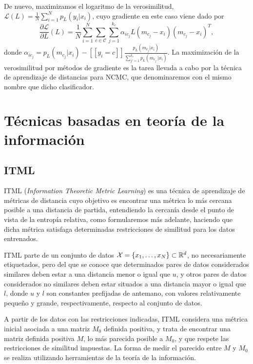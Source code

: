 De nuevo, maximizamos el logaritmo de la verosimilitud, $\mathcal{L}(L) = \frac{1}{N}\sum_{i=1}^N p_L(y_i|x_i)$, cuyo gradiente en este caso viene dado por
\begin{equation*}
    \frac{\partial \mathcal{L}}{\partial L}(L) = \frac{1}{N} \sum_{i=1}^N \sum_{c \in \mathcal{C}} \sum_{j=1}^{k_c} \alpha_{ic_j} L (m_{c_j}-x_i)(m_{c_j}-x_i)^T,
\end{equation*}
donde $\alpha_{ic_j} = p_L(m_{c_j}|x_i) - [\![ y_i = c ]\!] \frac{p_L(m_{c_j}|x_i)}{\sum_{j'=1}^{k_c} p_L(m_{c_{j'}}|x_i)}$. La maximización de la verosimilitud por métodos de gradiente es la tarea llevada a cabo por la técnica de aprendizaje de distancias para NCMC, que denominaremos con el mismo nombre que dicho clasificador.





\section{Técnicas basadas en teoría de la información}

\subsection{ITML}

ITML (\emph{Information Theoretic Metric Learning}) \cite{itml} es una técnica de aprendizaje de métricas de distancia cuyo objetivo es encontrar una métrica lo más cercana posible a una distancia de partida, entendiendo la cercanía desde el punto de vista de la entropía relativa, como formularemos más adelante, haciendo que dicha métrica satisfaga determinadas restricciones de similitud para los datos entrenados.

ITML parte de un conjunto de datos $\mathcal{X} = \{x_1,\dots,x_N\} \subset \mathbb{R}^d$, no necesariamente etiquetados, pero del que se conoce que determinados pares de datos considerados similares deben estar a una distancia menor o igual que $u$, y otros pares de datos considerados no similares deben estar situados a una distancia mayor o igual que $l$, donde $u$ y $l$ son constantes prefijadas de antemano, con valores relativamente pequeño y grande, respectivamente, respecto al conjunto de datos.

A partir de los datos con las restricciones indicadas, ITML considera una métrica inicial asociada a una matriz $M_0$ definida positiva, y trata de encontrar una matriz definida positiva $M$, lo más parecida posible a $M_0$, y que respete las restricciones de similitud impuestas. La forma de medir el parecido entre $M$ y $M_0$ se realiza utilizando herramientas de la teoría de la información.


